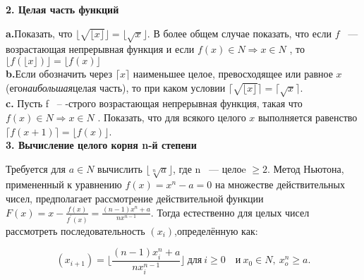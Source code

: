 \pagebreak



\noindent\textbf{2. Целая часть функций}\newline
\\
\restoretop
{}

\hspace*{15pt}\textbf {a.}Показать, что $\lfloor\sqrt{\lfloor {x }\rfloor}\rfloor=
\lfloor\sqrt{x}\rfloor$. В более общем случае показать, что если $f$ ~--- возрастающая непрерывная функция и если $f\left(x\right)\in{ N }\Rightarrow {x\in {N}}$ , то $\lfloor {f\left(\lfloor {x}\rfloor\right)}\rfloor=\lfloor{ f\left({x}\right)}\rfloor$\newline
\\
\hspace*{15pt}\textbf{b.}Если обозначить через $\lceil{x}\rceil$ наименьшее целое, превосходящее или равное $x$ (его{\it наибольшая}целая часть), то при каком условии $\lceil{\sqrt{\lfloor {x}\rfloor}}\rceil=\lceil{\sqrt{x}}\rceil$.\newline
\\
\hspace*{15pt}\textbf{c.} Пусть f ~-- -строго возрастающая непрерывная функция, такая что $f\left(x\right)\in{ N }\Rightarrow {x\in {N}}$ . Показать, что для всякого целого $x$ выполняется равенство $\lceil{f\left({x+1}\right)}\rceil=\lfloor{f\left({x}\right)}\rfloor$. \newline
\\
\noindent\textbf{3. Вычисление целого корня n-й степени}\ \newline

Требуется для $a\in{N}$ вычислить $\lfloor{\sqrt[n]{a}}\rfloor$, где n ~--- целоe $ \geqslant{2}$. Метод Ньютона, примененный к уравнению $f\left({x}\right)=x^{n}-a=0$ на множестве действительных чисел, предполагает рассмотрение действительной функции $F\left({x}\right)=x-\frac{f\left({x}\right)}{f^\prime\left({x}\right)}= \frac{\left({n-1}\right)x^{n}+a}{nx^{n-1}}$. Тогда естественно для целых чисел рассмотреть последовательность $\left({x_{i}}\right)$,определённую как:

\begin{equation*}
\left({x_{i+1}}\right)=\lfloor\frac{\left({n-1}\right)x_i^n+a}{nx_i^{n-1}}\rfloor ~\text{для}~ i\geqslant{0}\quad\text{и}~ x_{0}\in{N}, ~x_o^n\geqslant{a}.
\end{equation*}

